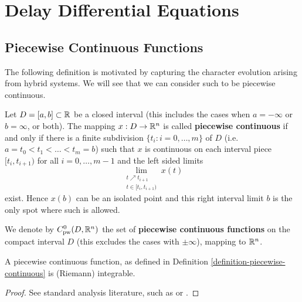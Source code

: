 \section{Delay Differential Equations} \label{sec:delay-differential-equations}

\subsection{Piecewise Continuous Functions} \label{sec:piecewise-continuous-functions}
The following definition is motivated by capturing the character evolution arising from hybrid systems. We will see that we can consider such to be piecewise continuous.

\begin{definition}
    \label{definition-piecewise-continuous}

    Let $D=[a,b]\subset\mathbb{R}$ be a closed interval (this includes the cases when $a=-\infty$ or $b=\infty$, or both). The mapping $x:D\rightarrow\mathbb{R}^n$ is called \textbf{piecewise continuous} if and only if there is a finite subdivision $\{t_i:i=0,\ldots,m\}$ of $D$ (i.e.\ $a=t_0<t_1<\ldots<t_m=b$) such that $x$ is continuous on each interval piece $[t_i,t_{i+1})$ for all $i=0,\ldots,m-1$ and the left sided limits
    \begin{equation}
        \lim_{\substack{t\nearrow t_{i+1}\\ t\in[t_i,t_{i+1})}} x(t)
    \end{equation}
    exist. Hence $x(b)$ can be an isolated point and this right interval limit $b$ is the only spot where such is allowed.

    We denote by $C^0_\text{pw}(D,\mathbb{R}^n)$ the set of \textbf{piecewise continuous functions} on the compact interval $D$ (this excludes the cases with $\pm\infty$), mapping to $\mathbb{R}^n$.

\end{definition}


\begin{lemma}[]
    \label{lemma-piecewise-continuous-integrable}

    A piecewise continuous function, as defined in Definition \ref{definition-piecewise-continuous} is (Riemann) integrable.
\end{lemma}

\begin{proof}
    See standard analysis literature, such as \cite{rudin1976principles} or \cite{gathmanngrundlagen}.
\end{proof}

